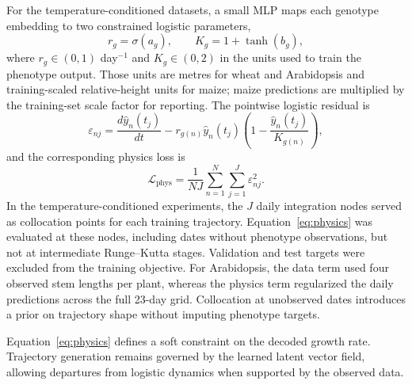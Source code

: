 \documentclass[preprint,12pt,authoryear]{elsarticle}
\begin{document}
For the temperature-conditioned datasets, a small MLP maps each genotype embedding to two constrained logistic parameters,
\begin{equation}
 r_g=\sigma(a_g), \qquad K_g=1+\tanh(b_g),
 \label{eq:logistic_parameters}
\end{equation}
where $r_g\in(0,1)$ day$^{-1}$ and $K_g\in(0,2)$ in the units used to train the phenotype output. Those units are metres for wheat and Arabidopsis and training-scaled relative-height units for maize; maize predictions are multiplied by the training-set scale factor for reporting. The pointwise logistic residual is
\begin{equation}
 \varepsilon_{nj}
 =\frac{d\hat y_n(t_j)}{dt}
 -r_{g(n)}\hat y_n(t_j)
 \left(1-\frac{\hat y_n(t_j)}{K_{g(n)}}\right),
\end{equation}
and the corresponding physics loss is
\begin{equation}
 \mathcal L_{\mathrm{phys}}
 =\frac{1}{N J}\sum_{n=1}^{N}\sum_{j=1}^{J}\varepsilon_{nj}^{2}.
 \label{eq:physics}
\end{equation}
In the temperature-conditioned experiments, the $J$ daily integration nodes served as collocation points for each training trajectory. Equation~\eqref{eq:physics} was evaluated at these nodes, including dates without phenotype observations, but not at intermediate Runge--Kutta stages. Validation and test targets were excluded from the training objective. For Arabidopsis, the data term used four observed stem lengths per plant, whereas the physics term regularized the daily predictions across the full 23-day grid. Collocation at unobserved dates introduces a prior on trajectory shape without imputing phenotype targets.

Equation~\eqref{eq:physics} defines a soft constraint on the decoded growth rate. Trajectory generation remains governed by the learned latent vector field, allowing departures from logistic dynamics when supported by the observed data.
\end{document}
